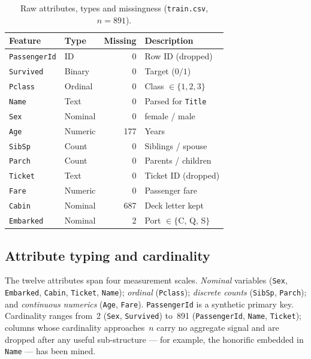 \documentclass[10pt,a4paper,twocolumn]{article}
\begin{document}
\begin{table}[tb]
\centering\small
\caption{Raw attributes, types and missingness (\texttt{train.csv}, $n = 891$).}
\label{tab:features}
\begin{tabular}{@{}llrp{}@{}}
\toprule
Feature & Type & Missing & Description \\
\midrule
\texttt{PassengerId} & ID & 0 & Row ID (dropped) \\
\texttt{Survived}    & Binary & 0 & Target ($0/1$) \\
\texttt{Pclass}      & Ordinal & 0 & Class $\in\{1,2,3\}$ \\
\texttt{Name}        & Text & 0 & Parsed for \texttt{Title} \\
\texttt{Sex}         & Nominal & 0 & female / male \\
\texttt{Age}         & Numeric & 177 & Years \\
\texttt{SibSp}       & Count & 0 & Siblings / spouse \\
\texttt{Parch}       & Count & 0 & Parents / children \\
\texttt{Ticket}      & Text & 0 & Ticket ID (dropped) \\
\texttt{Fare}        & Numeric & 0 & Passenger fare \\
\texttt{Cabin}       & Nominal & 687 & Deck letter kept \\
\texttt{Embarked}    & Nominal & 2 & Port $\in\{$C, Q, S$\}$ \\
\bottomrule
\end{tabular}
\end{table}

\subsection{Attribute typing and cardinality}
The twelve attributes span four measurement scales. \emph{Nominal} variables
(\texttt{Sex}, \texttt{Embarked}, \texttt{Cabin}, \texttt{Ticket}, \texttt{Name});
\emph{ordinal} (\texttt{Pclass}); \emph{discrete counts} (\texttt{SibSp},
\texttt{Parch}); and \emph{continuous numerics} (\texttt{Age}, \texttt{Fare}).
\texttt{PassengerId} is a synthetic primary key. Cardinality ranges from~2
(\texttt{Sex}, \texttt{Survived}) to~891 (\texttt{PassengerId},
\texttt{Name}, \texttt{Ticket}); columns whose cardinality approaches~$n$ carry no
aggregate signal and are dropped after any useful sub-structure --- for example, the
honorific embedded in \texttt{Name} --- has been mined.
\end{document}

